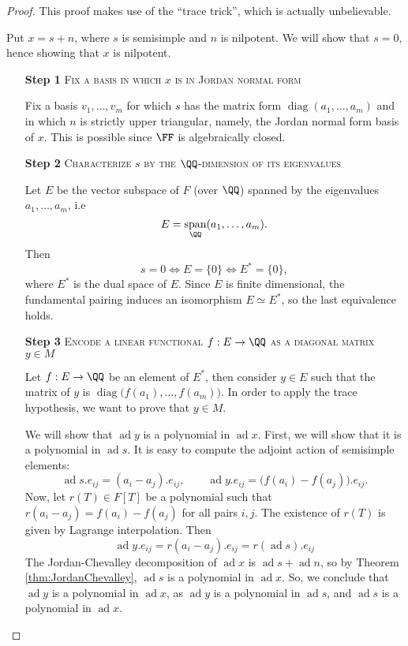 \documentclass{article}
\DeclareMathOperator{\diag}{diag}
\DeclareMathOperator{\opspan}{span}
\newcommand*\ad{\operatorname{ad}}
\newcommand*\acts{.}
\begin{document}
\begin{proof}
    This proof makes use of the ``trace trick'', which is actually unbelievable.

    Put $x = s + n$, where $s$ is semisimple and $n$ is nilpotent.
    We will show that $s=0$, hence showing that $x$ is nilpotent.
    \begin{itemize}
        \item[\textbf{Step 1}]
            \textsc{\color{Crimson} Fix a basis in which $x$ is in Jordan normal form}

            Fix a basis $v_1,\ldots,v_m$ for which $s$ has the matrix form $\diag(a_1,\ldots,a_m)$ and in which $n$ is strictly upper triangular, namely, the Jordan normal form basis of $x$.
            This is possible since $\FF$ is algebraically closed.

        \item[\textbf{Step 2}]
            \textsc{\color{Crimson} Characterize $s$ by the $\QQ$-dimension of its eigenvalues}

            Let $E$ be the vector subspace of $F$ (over $\QQ$) spanned by the eigenvalues $a_1,\ldots,a_m$, i.e
            \[
                E = \opspan_\QQ(a_1,\ldots,a_m).
            \]
            Then
            \[
                s = 0 \iff E = \{0\} \iff E^\ast = \{0\},
            \]
            where $E^\ast$ is the dual space of $E$.
            Since $E$ is finite dimensional, the fundamental pairing induces an isomorphism $E \simeq E^\ast$, so the last equivalence holds.

        \item[\textbf{Step 3}]
            \textsc{\color{Crimson} Encode a linear functional $f: E \to \QQ$ as a diagonal matrix $y \in M$}

            Let $f: E \to \QQ$ be an element of $E^\ast$, then consider $y \in E$ such that the matrix of $y$ is $\diag\big(f(a_1),\ldots,f(a_m)\big)$.
            In order to apply the trace hypothesis, we want to prove that $y \in M$.

            We will show that $\ad y$ is a polynomial in $\ad x$.
            First, we will show that it is a polynomial in $\ad s$.
            It is easy to compute the adjoint action of semisimple elements:
            \[
                \ad s \acts e_{ij}
                =
                (a_i - a_j) \acts e_{ij}, \qquad
                \ad y \acts e_{ij}
                =
                \big(f(a_i) - f(a_j)\big) \acts e_{ij}.
            \]
            Now, let $r(T) \in F[T]$ be a polynomial such that $r(a_i-a_j) = f(a_i)-f(a_j)$ for all pairs $i, j$.
            The existence of $r(T)$ is given by Lagrange interpolation.
            Then
            \[
                \ad y \acts e_{ij}
                =
                r(a_i-a_j) \acts e_{ij}
                =
                r(\ad s) \acts e_{ij}
            \]
            The Jordan-Chevalley decomposition of $\ad x$ is $\ad s + \ad n$, so by Theorem \ref{thm:JordanChevalley}, $\ad s$ is a polynomial in $\ad x$.
            So, we conclude that $\ad y$ is a polynomial in $\ad x$, as $\ad y$ is a polynomial in $\ad s$, and $\ad s$ is a polynomial in $\ad x$.


\end{itemize}
\end{proof}
\end{document}
